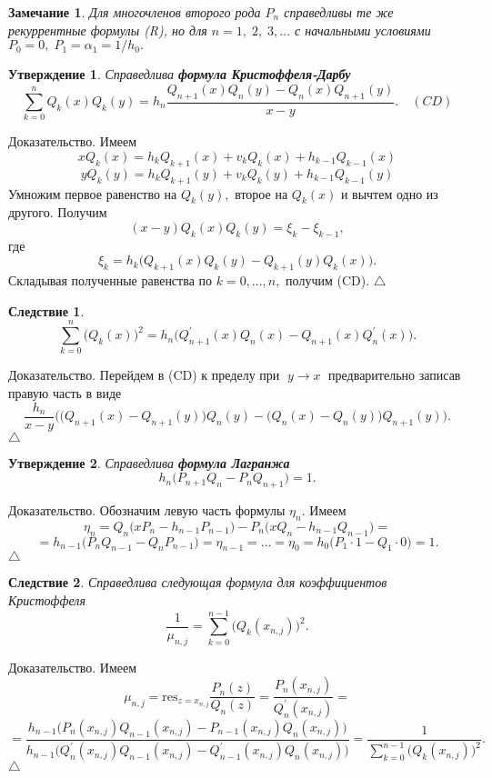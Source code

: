 \documentclass[12pt,a4paper]{article}
\theoremstyle{plain}   \newtheorem{Pro}{Задача}
\newtheorem{Sta}{Утверждение}
\newtheorem{Rem}{Замечание}
\newtheorem{Cor}{Следствие}
\begin{document}
\begin{Rem}
Для многочленов второго рода
$ P_n $
справедливы те же рекуррентные формулы (R), но для
$ n=1, \; 2, \; 3,... $
с начальными условиями
$ P_0 =0, \; P_1 =\alpha _1 =1/h_0 . $
\end{Rem}
\begin{Sta}
Справедлива
{\bfseries формула Кристоффеля-Дарбу}
$$
  \sum _{k=0}^n Q_k (x)Q_k (y)=h_n
  \frac{Q_{n+1}(x)Q_n (y)-Q_n (x)Q_{n+1}(y)}{x-y}.
  \quad (CD)
$$
\end{Sta}
{\Large Доказательство.}
Имеем
$$
  xQ_k (x)=h_k Q_{k+1}(x)+v_k Q_k (x)+h_{k-1}Q_{k-1}(x)
$$
$$
  yQ_k (y)=h_k Q_{k+1}(y)+v_k Q_k (y)+h_{k-1}Q_{k-1}(y)
$$
Умножим первое равенство на
$ Q_k (y) , $
второе на
$ Q_k (x) $
и вычтем одно из другого. Получим
$$
  (x-y)Q_k (x)Q_k (y)=\xi _k -\xi _{k-1} ,
$$
где
$$
  \xi _k =h_k \biggl ( Q_{k+1}(x)Q_k (y)-Q_{k+1}(y)Q_k (x) \biggr ) .
$$
Складывая полученные равенства по
$ k=0,...,n , $
получим (CD). $ \triangle $
\begin{Cor}
$$
  \sum _{k=0}^n \bigl ( Q_k (x) \bigr ) ^2 =
  h_n \biggl ( Q_{n+1}^{\prime}(x)Q_n (x)-
  Q_{n+1}(x)Q_n ^{\prime}(x) \biggr ) .
$$
\end{Cor}
{\Large Доказательство.}
Перейдем в (CD) к пределу при
$ \; y \rightarrow x \; $
предварительно записав правую часть в виде
$$
  \frac{h_n}{x-y} \Biggl ( \bigl ( Q_{n+1}(x)-Q_{n+1}(y) \bigr )
  Q_n (y) - \bigl ( Q_n (x)-Q_n(y) \bigr ) Q_{n+1}(y) \Biggr ) .
$$
$ \triangle $
\begin{Sta}
Справедлива
{\bfseries формула Лагранжа}
$$
  h_n \bigl ( P_{n+1}Q_n -P_n Q_{n+1} \bigr ) =1.
$$
\end{Sta}
{\Large Доказательство.}
Обозначим левую часть формулы
$ \eta _n . $
Имеем
$$
  \eta _n = Q_n \bigl ( xP_n -h_{n-1}P_{n-1} \bigr ) -
  P_n \bigl ( xQ_n -h_{n-1}Q_{n-1} \bigr ) =
$$
$$
  =h_{n-1} \bigl (P_n Q_{n-1}-Q_nP_{n-1} \bigr ) =
  \eta _{n-1} =...=\eta _0 =
  h_0 \bigl ( P_1 \cdot 1-Q_1 \cdot 0 \bigr ) =1.
$$
$ \triangle $
\begin{Cor}
Справедлива следующая формула для коэффициентов Кристоффеля
$$
  \frac{1}{\mu _{n,j}}=
  \sum _{k=0}^{n-1} \bigl ( Q_k (x_{n,j}) \bigr ) ^2 .
$$
\end{Cor}
{\Large Доказательство.}
Имеем
$$
 \mu _{n,j}=\mathrm{res}_{z=x_{n,j}}
 \frac{P_n (z)}{Q_n (z)}=
 \frac{P_n (x_{n,j})}{Q_n ^{\prime}(x_{n,j})}=
$$
$$
 =\frac{h_{n-1} \bigl ( P_n (x_{n,j})Q_{n-1}(x_{n,j})-
 P_{n-1}(x_{n,j})Q_n (x_{n,j}) \bigr ) }
 {h_{n-1} \bigl ( Q_n ^{\prime}(x_{n,j})Q_{n-1}(x_{n,j})-
 Q_{n-1}^{\prime}(x_{n,j})Q_n (x_{n,j}) \bigr ) } =
 \frac{1}{\sum _{k=0}^{n-1} \bigl ( Q_k (x_{n,j}) \bigr ) ^2 } .
$$
$ \triangle $
\newpage
\end{document}
